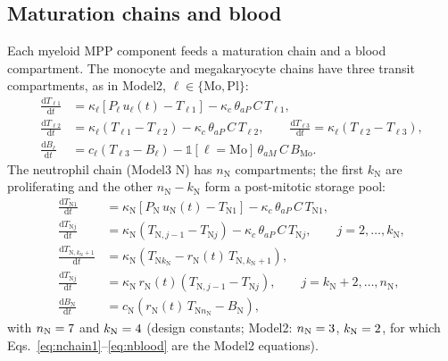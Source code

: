 \documentclass[11pt]{article}
\newcommand{\dd}{\mathrm{d}}
\newcommand{\one}{\mathbb{1}}
\begin{document}


\subsection{Maturation chains and blood}\label{sec:chains}
Each myeloid MPP component feeds a maturation chain and a blood compartment. The monocyte and megakaryocyte chains have three transit compartments, as in Model2, $\ell\in\{\mathrm{Mo},\mathrm{Pl}\}$:
\begin{align}
\frac{\dd T_{\ell1}}{\dd t} &= \kappa_\ell\left[P_\ell\,u_\ell(t) - T_{\ell1}\right] - \kappa_c\,\theta_{aP}\,C\,T_{\ell1}, \label{eq:chain1}\\
\frac{\dd T_{\ell2}}{\dd t} &= \kappa_\ell\left(T_{\ell1}-T_{\ell2}\right) - \kappa_c\,\theta_{aP}\,C\,T_{\ell2}, \qquad
\frac{\dd T_{\ell3}}{\dd t} = \kappa_\ell\left(T_{\ell2}-T_{\ell3}\right), \label{eq:chain2}\\
\frac{\dd B_\ell}{\dd t} &= c_\ell\left(T_{\ell3}-B_\ell\right) - \one[\ell=\mathrm{Mo}]\,\theta_{aM}\,C\,B_{\mathrm{Mo}}. \label{eq:blood}
\end{align}
The neutrophil chain (Model3 N) has $n_{\mathrm{N}}$ compartments; the first $k_{\mathrm{N}}$ are proliferating and the other $n_{\mathrm{N}}-k_{\mathrm{N}}$ form a post-mitotic storage pool:
\begin{align}
\frac{\dd T_{\mathrm{N}1}}{\dd t} &= \kappa_{\mathrm{N}}\left[P_{\mathrm{N}}\,u_{\mathrm{N}}(t) - T_{\mathrm{N}1}\right] - \kappa_c\,\theta_{aP}\,C\,T_{\mathrm{N}1}, \label{eq:nchain1}\\
\frac{\dd T_{\mathrm{N}j}}{\dd t} &= \kappa_{\mathrm{N}}\left(T_{\mathrm{N},j-1}-T_{\mathrm{N}j}\right) - \kappa_c\,\theta_{aP}\,C\,T_{\mathrm{N}j}, \qquad j=2,\dots,k_{\mathrm{N}}, \label{eq:nchain2}\\
\frac{\dd T_{\mathrm{N},k_{\mathrm{N}}+1}}{\dd t} &= \kappa_{\mathrm{N}}\left(T_{\mathrm{N}k_{\mathrm{N}}}-r_{\mathrm{N}}(t)\,T_{\mathrm{N},k_{\mathrm{N}}+1}\right), \label{eq:nchain3}\\
\frac{\dd T_{\mathrm{N}j}}{\dd t} &= \kappa_{\mathrm{N}}\,r_{\mathrm{N}}(t)\left(T_{\mathrm{N},j-1}-T_{\mathrm{N}j}\right), \qquad j=k_{\mathrm{N}}+2,\dots,n_{\mathrm{N}}, \label{eq:nchain4}\\
\frac{\dd B_{\mathrm{N}}}{\dd t} &= c_{\mathrm{N}}\left(r_{\mathrm{N}}(t)\,T_{\mathrm{N}n_{\mathrm{N}}}-B_{\mathrm{N}}\right), \label{eq:nblood}
\end{align}
with $n_{\mathrm{N}}=7$ and $k_{\mathrm{N}}=4$ (design constants; Model2: $n_{\mathrm{N}}=3$, $k_{\mathrm{N}}=2$, for which Eqs.~\ref{eq:nchain1}--\ref{eq:nblood} are the Model2 equations).
\end{document}
